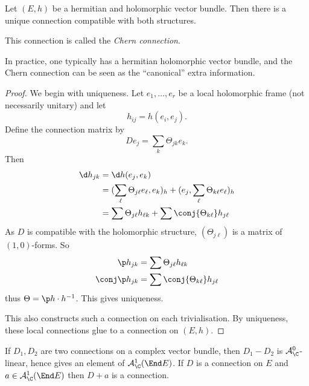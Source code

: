 \documentclass[a4paper]{article}
\begin{document}
\begin{proposition}
  Let \((E, h)\) be a hermitian and holomorphic vector bundle. Then there is a unique connection compatible with both structures.
\end{proposition}

\begin{definition}
  This connection is called the \emph{Chern connection}.
\end{definition}

\begin{remark}
  In practice, one typically has a hermitian holomorphic vector bundle, and the Chern connection can be seen as the ``canonical'' extra information.
\end{remark}

\begin{proof}
  We begin with uniqueness. Let \(e_1, \dots, e_r\) be a local holomorphic frame (not necessarily unitary) and let
  \[
    h_{ij} = h(e_i, e_j).
  \]
  Define the connection matrix by
  \[
    De_j = \sum_k \Theta_{jk} e_k.
  \]
  Then
  \begin{align*}
    \d h_{jk}
    &= \d h(e_j, e_k) \\
    &= (\sum_\ell \Theta_{j\ell} e_\ell, e_k)_h + (e_j, \sum_\ell \Theta_{k\ell} e_\ell)_h \\
    &= \sum \Theta_{j\ell} h_{\ell k} + \sum \conj{\Theta_{k\ell}} h_{j\ell}
  \end{align*}
  As \(D\) is compatible with the holomorphic structure, \((\Theta_{j\ell})\) is a matrix of \((1, 0)\)-forms. So
  \begin{align*}
    \p h_{jk} &= \sum \Theta_{j\ell} h_{\ell k} \\
    \conj \p h_{jk} &= \sum \conj{\Theta_{k\ell}} h_{j\ell}
  \end{align*}
  thus \(\Theta =  \p h \cdot h^{-1}\). This gives uniqueness.

  This also constructs such a connection on each trivialisation. By uniqueness, these local connections glue to a connection on \((E, h)\).
\end{proof}

\begin{lemma}
  If \(D_1, D_2\) are two connections on a complex vector bundle, then \(D_1 - D_2\) is \(\mathcal A_\C^0\)-linear, hence gives an element of \(\mathcal A^1_\C(\End E)\). If \(D\) is a connection on \(E\) and \(a \in \mathcal A_\C^1(\End E)\) then \(D + a\) is a connection.
\end{lemma}
\end{document}

